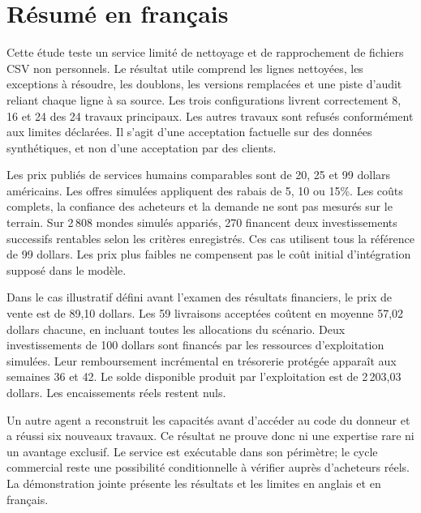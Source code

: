 \documentclass[11pt,letterpaper]{article}
\begin{document}
\section*{R\'esum\'e en fran\c{c}ais}
\begingroup{}
Cette \'etude teste un service limit\'e de nettoyage et de rapprochement de fichiers CSV non personnels. Le r\'esultat utile comprend les lignes nettoy\'ees, les exceptions \`a r\'esoudre, les doublons, les versions remplac\'ees et une piste d'audit reliant chaque ligne \`a sa source. Les trois configurations livrent correctement 8, 16 et 24 des 24 travaux principaux. Les autres travaux sont refus\'es conform\'ement aux limites d\'eclar\'ees. Il s'agit d'une acceptation factuelle sur des donn\'ees synth\'etiques, et non d'une acceptation par des clients.

Les prix publi\'es de services humains comparables sont de 20, 25 et 99 dollars am\'ericains. Les offres simul\'ees appliquent des rabais de 5, 10 ou 15\%. Les co\^uts complets, la confiance des acheteurs et la demande ne sont pas mesur\'es sur le terrain. Sur 2\,808 mondes simul\'es appari\'es, 270 financent deux investissements successifs rentables selon les crit\`eres enregistr\'es. Ces cas utilisent tous la r\'ef\'erence de 99 dollars. Les prix plus faibles ne compensent pas le co\^ut initial d'int\'egration suppos\'e dans le mod\`ele.

Dans le cas illustratif d\'efini avant l'examen des r\'esultats financiers, le prix de vente est de 89,10 dollars. Les 59 livraisons accept\'ees co\^utent en moyenne 57,02 dollars chacune, en incluant toutes les allocations du sc\'enario. Deux investissements de 100 dollars sont financ\'es par les ressources d'exploitation simul\'ees. Leur remboursement incr\'emental en tr\'esorerie prot\'eg\'ee appara\^it aux semaines 36 et 42. Le solde disponible produit par l'exploitation est de 2\,203,03 dollars. Les encaissements r\'eels restent nuls.

Un autre agent a reconstruit les capacit\'es avant d'acc\'eder au code du donneur et a r\'eussi six nouveaux travaux. Ce r\'esultat ne prouve donc ni une expertise rare ni un avantage exclusif. Le service est ex\'ecutable dans son p\'erim\`etre; le cycle commercial reste une possibilit\'e conditionnelle \`a v\'erifier aupr\`es d'acheteurs r\'eels. La d\'emonstration jointe pr\'esente les r\'esultats et les limites en anglais et en fran\c{c}ais.
\endgroup
\end{document}
